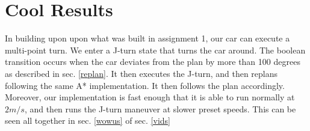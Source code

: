 \section{Cool Results}
In building upon upon what was built in assignment 1, our car can execute a multi-point turn. We enter a J-turn state that turns the car around. The boolean transition occurs when the car deviates from the plan by more than 100 degrees as described in sec. \ref{replan}. It then executes the J-turn, and then replans following the same A* implementation. It then follows the plan accordingly. Moreover, our implementation is fast enough that it is able to run normally at $2 m/s$, and then runs the J-turn maneuver at slower preset speeds. This can be seen all together in sec. \ref{wowus} of sec. \ref{vids}